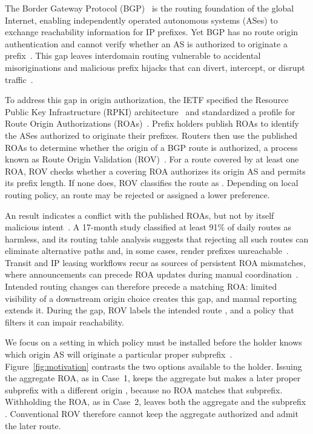 \label{sec:introduction}

The Border Gateway Protocol (BGP)~\cite{rfc4271} is the routing foundation of the global Internet, enabling independently operated autonomous systems (ASes) to exchange reachability information for IP prefixes. Yet BGP has no route origin authentication and cannot verify whether an AS is authorized to originate a prefix~\cite{rfc4272,kent2000sbgp}. This gap leaves interdomain routing vulnerable to accidental misoriginations and malicious prefix hijacks that can divert, intercept, or disrupt traffic~\cite{ballani2007hijacking,butler2010bgp}.

To address this gap in origin authorization, the IETF specified the Resource Public Key Infrastructure (RPKI) architecture~\cite{rfc6480} and standardized a profile for Route Origin Authorizations (ROAs)~\cite{rfc9582}. Prefix holders publish ROAs to identify the ASes authorized to originate their prefixes. Routers then use the published ROAs to determine whether the origin of a BGP route is authorized, a process known as Route Origin Validation (ROV)~\cite{rfc6811,rfc8481}. For a route covered by at least one ROA, ROV checks whether a covering ROA authorizes its origin AS and permits its prefix length. If none does, ROV classifies the route as \invalid{}. Depending on local routing policy, an \invalid{} route may be rejected or assigned a lower preference.

An \invalid{} result indicates a conflict with the published ROAs, but not by itself malicious intent~\cite{chung2019,xu2019falsealarm,schulmann2025learning}. A 17-month study classified at least 91\% of daily \invalid{} routes as harmless, and its routing table analysis suggests that rejecting all such routes can eliminate alternative paths and, in some cases, render prefixes unreachable~\cite{righttheship2025}. Transit and IP leasing workflows recur as sources of persistent ROA mismatches, where announcements can precede ROA updates during manual coordination~\cite{demystifying2026}. Intended routing changes can therefore precede a matching ROA: limited visibility of a downstream origin choice creates this gap, and manual reporting extends it. During the gap, ROV labels the intended route \invalid{}, and a policy that filters it can impair reachability.

We focus on a setting in which policy must be installed before the holder knows which origin AS will originate a particular proper subprefix~\cite{demystifying2026,leasing2026}. Figure~\ref{fig:motivation} contrasts the two options available to the holder. Issuing the aggregate ROA, as in Case~1, keeps the aggregate \valid{} but makes a later proper subprefix with a different origin \invalid{}, because no ROA matches that subprefix. Withholding the ROA, as in Case~2, leaves both the aggregate and the subprefix \notfound{}. Conventional ROV therefore cannot keep the aggregate authorized and admit the later route.

